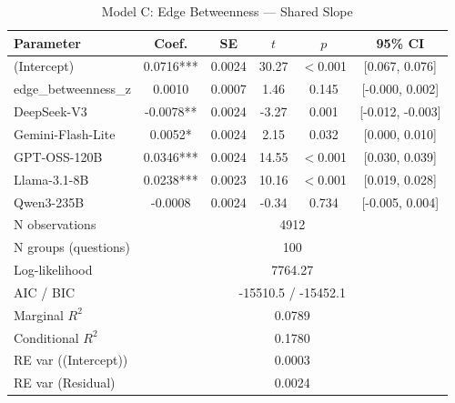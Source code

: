 \begin{table}[htbp]
\centering
\small
\caption{Model C: Edge Betweenness --- Shared Slope}
\label{tab:lme_model_c_shared_table}
\begin{tabular}{lccccc}
\toprule
Parameter & Coef. & SE & $t$ & $p$ & 95\% CI \\
\midrule
  (Intercept) & 0.0716*** & 0.0024 & 30.27 & $<$0.001 & [0.067, 0.076] \\
  edge\_betweenness\_z & 0.0010 & 0.0007 & 1.46 & 0.145 & [-0.000, 0.002] \\
  DeepSeek-V3 & -0.0078** & 0.0024 & -3.27 & 0.001 & [-0.012, -0.003] \\
  Gemini-Flash-Lite & 0.0052* & 0.0024 & 2.15 & 0.032 & [0.000, 0.010] \\
  GPT-OSS-120B & 0.0346*** & 0.0024 & 14.55 & $<$0.001 & [0.030, 0.039] \\
  Llama-3.1-8B & 0.0238*** & 0.0023 & 10.16 & $<$0.001 & [0.019, 0.028] \\
  Qwen3-235B & -0.0008 & 0.0024 & -0.34 & 0.734 & [-0.005, 0.004] \\
\midrule
  N observations & \multicolumn{5}{c}{4912} \\
  N groups (questions) & \multicolumn{5}{c}{100} \\
  Log-likelihood & \multicolumn{5}{c}{7764.27} \\
  AIC / BIC & \multicolumn{5}{c}{-15510.5 / -15452.1} \\
  Marginal $R^2$ & \multicolumn{5}{c}{0.0789} \\
  Conditional $R^2$ & \multicolumn{5}{c}{0.1780} \\
  RE var ((Intercept)) & \multicolumn{5}{c}{0.0003} \\
  RE var (Residual) & \multicolumn{5}{c}{0.0024} \\
\bottomrule
\end{tabular}
\end{table}

